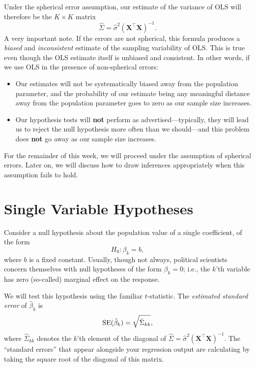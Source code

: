 \documentclass[12pt,oneside,openany]{book}
\begin{document}
Under the spherical error assumption, our estimate of the variance of
OLS will therefore be the \(K \times K\) matrix \[
\hat{\Sigma} = \hat{\sigma}^2 (\mathbf{X}^\top \mathbf{X})^{-1}.
\] A very important note. If the errors are not spherical, this formula
produces a \emph{biased} and \emph{inconsistent} estimate of the
sampling variability of OLS. This is true even though the OLS estimate
itself is unbiased and consistent. In other words, if we use OLS in the
presence of non-spherical errors:

\begin{itemize}
\item
  Our estimates will not be systematically biased away from the
  population parameter, and the probability of our estimate being any
  meaningful distance away from the population parameter goes to zero as
  our sample size increases.
\item
  Our hypothesis tests will \textbf{not} perform as
  advertised---typically, they will lead us to reject the null
  hypothesis more often than we should---and this problem does
  \textbf{not} go away as our sample size increases.
\end{itemize}

For the remainder of this week, we will proceed under the assumption of
spherical errors. Later on, we will discuss how to draw inferences
appropriately when this assumption fails to hold.

\section{Single Variable Hypotheses}\label{single-variable-hypotheses}

Consider a null hypothesis about the population value of a single
coefficient, of the form \[
H_0 : \beta_k = b,
\] where \(b\) is a fixed constant. Usually, though not always,
political scientists concern themselves with null hypotheses of the form
\(\beta_k = 0\); i.e., the \(k\)'th variable has zero (so-called)
marginal effect on the response.

We will test this hypothesis using the familiar \(t\)-statistic. The
\emph{estimated standard error} of \(\hat{\beta}_k\) is \[
\mathop{\rm SE}\nolimits(\hat{\beta}_k) = \sqrt{\hat{\Sigma}_{kk}},
\] where \(\hat{\Sigma}_{kk}\) denotes the \(k\)'th element of the
diagonal of
\(\hat{\Sigma} = \hat{\sigma}^2 (\mathbf{X}^\top \mathbf{X})^{-1}\). The
``standard errors'' that appear alongside your regression output are
calculating by taking the square root of the diagonal of this matrix.
\end{document}
